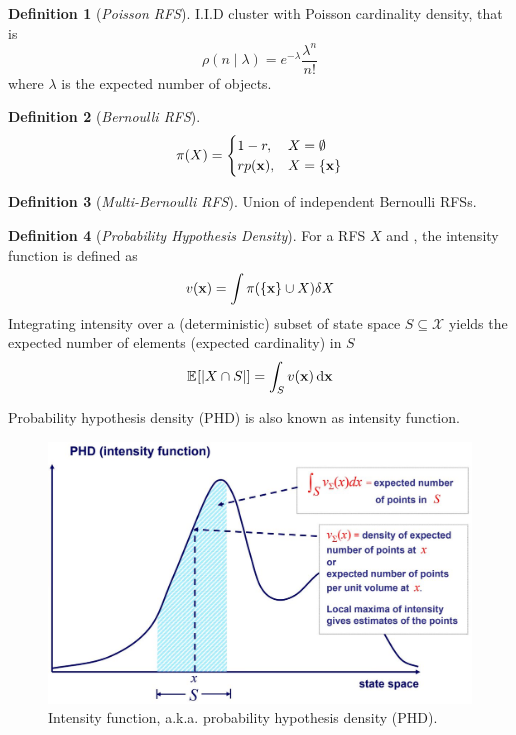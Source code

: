 \documentclass[a4paper,10pt]{scrreprt}
\theoremstyle{theorem}
\theoremstyle{definition}
\newtheorem{defn}{Definition}
\begin{document}
\begin{defn}[\emph{Poisson RFS}]
	I.I.D cluster with Poisson cardinality density, that is
	\begin{equation}\label{key}
		\rho(n \mid \lambda) = e^{-\lambda} \frac{\lambda^n}{n!}
	\end{equation}
	where \( \lambda \) is the expected number of objects.
\end{defn}

\begin{defn}[\emph{Bernoulli RFS}]
\begin{equation}\label{eq:bernoulli_rfs}
	\pi(X) = 
	\begin{cases}
	1 - r, 			& X = \emptyset \\
	r p(\stVar), 	& X = \Bqty{\stVar}
	\end{cases}
\end{equation}
\end{defn}

\begin{defn}[\emph{Multi-Bernoulli RFS}]
	Union of independent Bernoulli RFSs.
\end{defn}

\begin{defn}[\emph{Probability Hypothesis Density}]
	For a RFS \( X \) and , the intensity function is defined as
	\begin{equation}\label{key}
		v(\stVar) = \int \pi(\Bqty{\stVar} \cup X) \dsx[X]
	\end{equation}
	Integrating intensity over a (deterministic) subset of state space \( S \subseteq \mathcal{X} \) yields the expected number of elements (expected cardinality) in \( S \)
	\begin{equation}\label{key}
		\E{|X \cap S|} = \int_S v(\stVar) \dx[\stVar]
	\end{equation}
\end{defn}
Probability hypothesis density (PHD) is also known as intensity function.

\begin{figure}[h]
	\centering
	\includegraphics[scale=0.22]{./img/intensity_function}
	\caption{Intensity function, a.k.a. probability hypothesis density (PHD).}
\end{figure}
\end{document}
